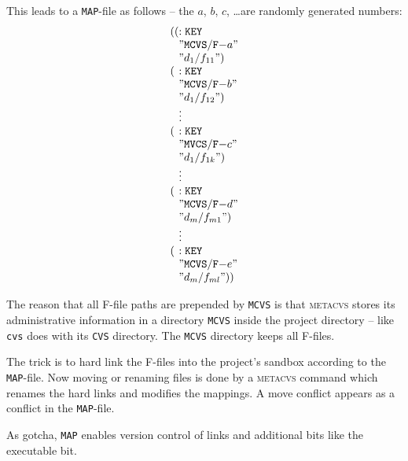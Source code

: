 \documentclass[fleqn, 10pt, a4paper]{report}
\begin{document}
This leads to a \texttt{MAP}-file as follows -- the $a$, $b$, $c$,
\ldots are randomly generated numbers:
\begin{displaymath}
\begin{array}{l@{}l}
\mathtt{((} & \mathtt{:KEY} \\
            & \mathtt{"MCVS/F-}a \mathtt{"} \\
            & \mathtt{"}d_1/f_{11}\mathtt{")} \\
\mathtt{(}  & \mathtt{:KEY} \\
            & \mathtt{"MCVS/F-}b \mathtt{"} \\
            & \mathtt{"}d_1/f_{12}\mathtt{")} \\
            & \vdots \\
\mathtt{(}  & \mathtt{:KEY} \\
            & \mathtt{"MVCS/F-}c \mathtt{"} \\
            & \mathtt{"}d_1/f_{1k}\mathtt{")} \\
            & \vdots \\
\mathtt{(}  & \mathtt{:KEY} \\
            & \mathtt{"MCVS/F-}d \mathtt{"} \\
            & \mathtt{"}d_m/f_{m1}\mathtt{")} \\
	    & \vdots \\
\mathtt{(}  & \mathtt{:KEY} \\
            & \mathtt{"MCVS/F-}e \mathtt{"} \\
            & \mathtt{"}d_m/f_{ml}\mathtt{"))} \\
\end{array}
\end{displaymath}

The reason that all F-file paths are prepended by
\texttt{MCVS} is that \textsc{metacvs} stores its
administrative information in a directory \texttt{MCVS}
inside the project directory -- like \texttt{cvs} does
with its \texttt{CVS} directory. The \texttt{MCVS}
directory keeps all F-files.

The trick is to hard link the F-files into the project's
sandbox according to the \texttt{MAP}-file. Now moving or
renaming files is done by a \textsc{metacvs} command which
renames the hard links and modifies the mappings. A move conflict
appears as a conflict in the \texttt{MAP}-file.

As gotcha, \texttt{MAP} enables version control of links and
additional bits like the executable bit.
\end{document}
